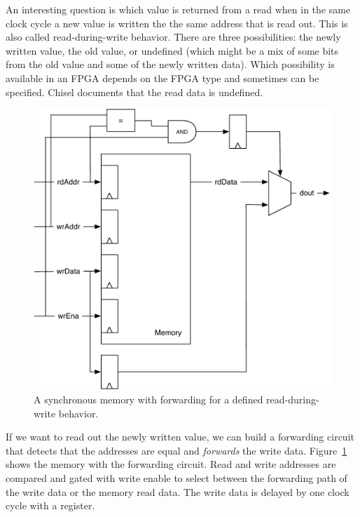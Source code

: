 \documentclass[%
    10pt,
    headinclude, footexclude,
    openright, %
    notitlepage,
    cleardoubleempty,
    headsepline,
    pointlessnumbers,
    bibtotoc, idxtotoc,
    ]{scrbook}
\newcommand{\scale}{0.7}
\begin{document}

An interesting question is which value is returned from a read when in the same clock
cycle a new value is written the the same address that is read out.
This is also called read-during-write behavior.
There are three possibilities: the newly written value, the old value, or undefined
(which might be a mix of some bits from the old value and some of the newly written data).
Which possibility is available in an FPGA depends on the FPGA type and
sometimes can be specified.
Chisel documents that the read data is undefined.

\begin{figure}
  \centering
  \includegraphics[scale=\scale]{figures/memory-forwarding}
  \caption{A synchronous memory with forwarding for a defined read-during-write behavior.}
  \label{fig:memory:forwarding}
\end{figure}

If we want to read out the newly written value, we can build a forwarding
circuit that detects that the addresses are equal and \emph{forwards} the
write data. Figure~\ref{fig:memory:forwarding} shows the memory with
the forwarding circuit. Read and write addresses are compared and gated with
write enable to select between the forwarding path of the write data or the
memory read data. The write data is delayed by one clock cycle with a register.
\end{document}
